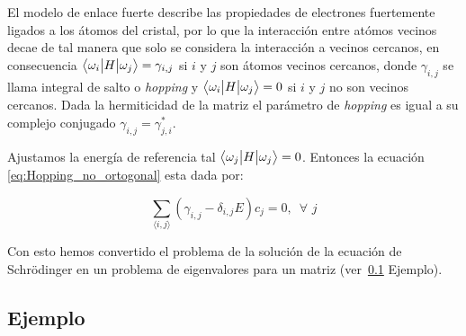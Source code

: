     El modelo de enlace fuerte describe las propiedades de electrones fuertemente ligados a los átomos del cristal, por lo que la interacción entre atómos vecinos decae de tal manera que solo se considera la interacción a vecinos cercanos, en consecuencia  $\big \langle{\omega_i}\big | {H} \big | {\omega_j} \big \rangle = \gamma_{i,j}$ si $i$ y $j$ son átomos vecinos cercanos, donde $\gamma_{i,j}$ se llama integral de salto o {\it hopping} y $\big \langle{\omega_i}\big | {H} \big | {\omega_j} \big \rangle = 0$ si $i$ y $j$ no son vecinos cercanos. Dada la hermiticidad de la matriz el parámetro de {\it hopping} es igual a su complejo conjugado $\gamma_{i,j} = \gamma^*_{j,i}$.

    Ajustamos la energía de referencia tal $\big \langle{\omega_j}\big | {H} \big | {\omega_j} \big \rangle = 0$. Entonces la ecuación \eqref{eq:Hopping_no_ortogonal} esta dada por:

    \begin{equation}
        \sum_{\langle i, j \rangle } ( \gamma_{i,j} - \delta_{i,j}E )c_j = 0, \,\,\, \forall\,\, j
    \end{equation}
    
    
    
    
    Con esto hemos convertido el problema de la solución de la ecuación de Schrödinger en un problema de eigenvalores para un matriz (ver~\ref{SecEjemplo} Ejemplo).

    \subsection{Ejemplo}
    \label{SecEjemplo}
    \vspace{-1.5cm}

